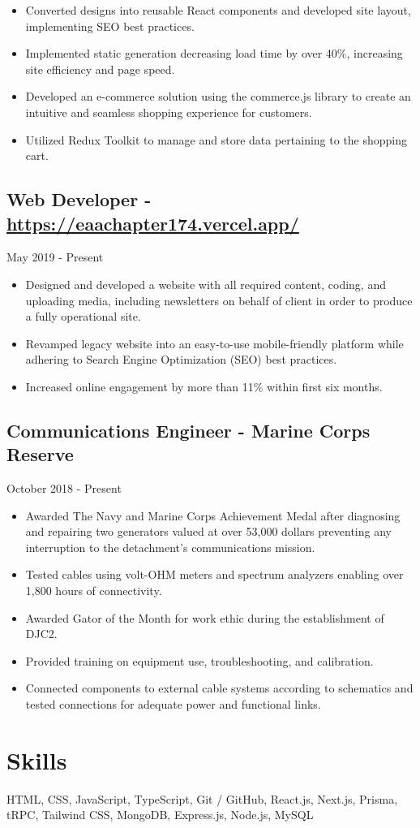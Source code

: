 \documentclass{article}
\begin{document}
	\begin{itemize}
		\item Converted designs into reusable React components and developed site layout, implementing SEO best practices.
		\item Implemented static generation decreasing load time by over 40\%, increasing site efficiency and page speed.
		\item Developed an e-commerce solution using the commerce.js library to create an intuitive and seamless shopping experience for customers.
		\item Utilized Redux Toolkit to manage and store data pertaining to the shopping cart.
	\end{itemize}

	\subsection*{Web Developer - \url{https://eaachapter174.vercel.app/}}

	May 2019 - Present
	
	\begin{itemize}
		\item Designed and developed a website with all required content, coding, and uploading media, including newsletters on behalf of client in order to produce a fully operational site.
		\item Revamped legacy website into an easy-to-use mobile-friendly platform while adhering to Search Engine Optimization (SEO) best practices.
		\item Increased online engagement by more than 11\% within first six months.
	\end{itemize}

	\subsection*{Communications Engineer - Marine Corps Reserve}

	October 2018 - Present
	
	\begin{itemize}
		\item Awarded The Navy and Marine Corps Achievement Medal after diagnosing and repairing two generators valued at over 53,000 dollars preventing any interruption to the detachment's communications mission.
		\item Tested cables using volt-OHM meters and spectrum analyzers enabling over 1,800 hours of connectivity.
		\item Awarded Gator of the Month for work ethic during the establishment of DJC2.
		\item Provided training on equipment use, troubleshooting, and calibration.
		\item Connected components to external cable systems according to schematics and tested connections for adequate power and functional links.
	\end{itemize}

	\section*{Skills}
	
	HTML, CSS, JavaScript, TypeScript, Git / GitHub, React.js, Next.js, Prisma, tRPC, Tailwind CSS, MongoDB, Express.js, Node.js, MySQL
	
\end{document}
